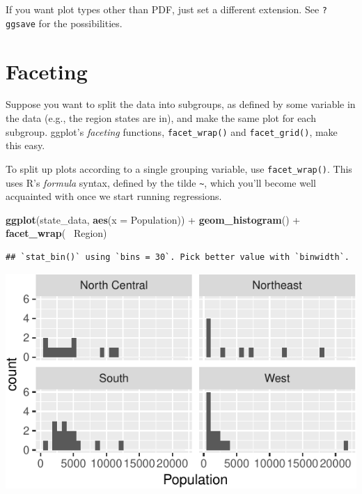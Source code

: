 \documentclass[12pt,oneside,openany]{book}
\newenvironment{Shaded}{\begin{snugshade}}{\end{snugshade}}
\newcommand{\KeywordTok}[1]{\textcolor[rgb]{0.13,0.29,0.53}{\textbf{{#1}}}}
\newcommand{\DataTypeTok}[1]{\textcolor[rgb]{0.13,0.29,0.53}{{#1}}}
\newcommand{\StringTok}[1]{\textcolor[rgb]{0.31,0.60,0.02}{{#1}}}
\newcommand{\NormalTok}[1]{{#1}}
\begin{document}
If you want plot types other than PDF, just set a different extension.
See \texttt{?ggsave} for the possibilities.

\section{Faceting}\label{faceting}

Suppose you want to split the data into subgroups, as defined by some
variable in the data (e.g., the region states are in), and make the same
plot for each subgroup. ggplot's \emph{faceting} functions,
\texttt{facet\_wrap()} and \texttt{facet\_grid()}, make this easy.

To split up plots according to a single grouping variable, use
\texttt{facet\_wrap()}. This uses R's \emph{formula} syntax, defined by
the tilde \texttt{\textasciitilde{}}, which you'll become well
acquainted with once we start running regressions.

\begin{Shaded}
\begin{Highlighting}[]
\KeywordTok{ggplot}\NormalTok{(state_data, }\KeywordTok{aes}\NormalTok{(}\DataTypeTok{x =} \NormalTok{Population)) +}
\StringTok{  }\KeywordTok{geom_histogram}\NormalTok{() +}
\StringTok{  }\KeywordTok{facet_wrap}\NormalTok{(~}\StringTok{ }\NormalTok{Region)}
\end{Highlighting}
\end{Shaded}

\begin{verbatim}
## `stat_bin()` using `bins = 30`. Pick better value with `binwidth`.
\end{verbatim}

\includegraphics{pdaps_files/figure-latex/facet-wrap-1.pdf}
\end{document}
